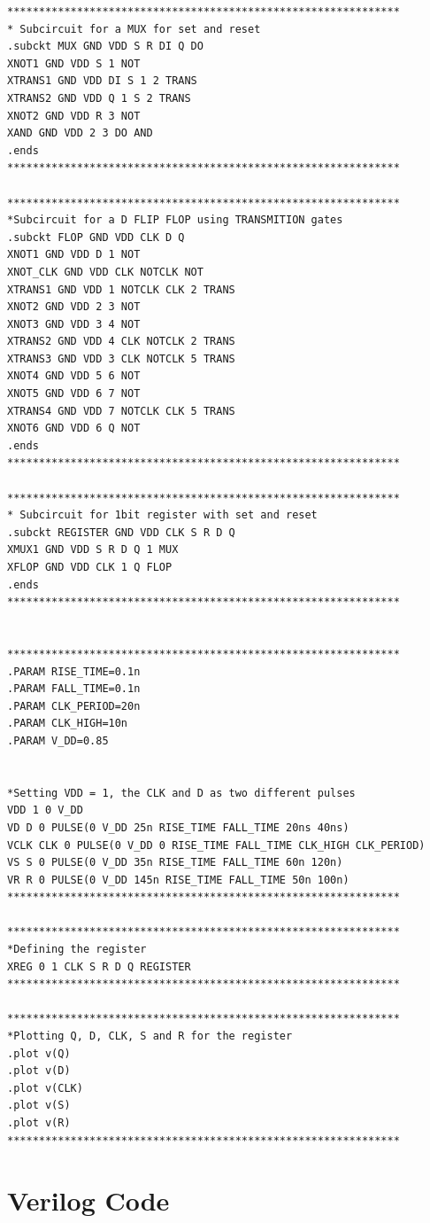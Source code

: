\begin{lstlisting}[style=aimspiceStyle, caption=1-bit register in AIMSPICE, label=testcode]
**************************************************************
* Subcircuit for a MUX for set and reset
.subckt MUX GND VDD S R DI Q DO
XNOT1 GND VDD S 1 NOT
XTRANS1 GND VDD DI S 1 2 TRANS
XTRANS2 GND VDD Q 1 S 2 TRANS
XNOT2 GND VDD R 3 NOT
XAND GND VDD 2 3 DO AND
.ends 
**************************************************************

**************************************************************
*Subcircuit for a D FLIP FLOP using TRANSMITION gates 
.subckt FLOP GND VDD CLK D Q 
XNOT1 GND VDD D 1 NOT
XNOT_CLK GND VDD CLK NOTCLK NOT
XTRANS1 GND VDD 1 NOTCLK CLK 2 TRANS
XNOT2 GND VDD 2 3 NOT
XNOT3 GND VDD 3 4 NOT 
XTRANS2 GND VDD 4 CLK NOTCLK 2 TRANS
XTRANS3 GND VDD 3 CLK NOTCLK 5 TRANS
XNOT4 GND VDD 5 6 NOT
XNOT5 GND VDD 6 7 NOT
XTRANS4 GND VDD 7 NOTCLK CLK 5 TRANS
XNOT6 GND VDD 6 Q NOT
.ends
**************************************************************

**************************************************************
* Subcircuit for 1bit register with set and reset
.subckt REGISTER GND VDD CLK S R D Q 
XMUX1 GND VDD S R D Q 1 MUX
XFLOP GND VDD CLK 1 Q FLOP
.ends
**************************************************************


**************************************************************
.PARAM RISE_TIME=0.1n 
.PARAM FALL_TIME=0.1n 
.PARAM CLK_PERIOD=20n 
.PARAM CLK_HIGH=10n 
.PARAM V_DD=0.85


*Setting VDD = 1, the CLK and D as two different pulses
VDD 1 0 V_DD
VD D 0 PULSE(0 V_DD 25n RISE_TIME FALL_TIME 20ns 40ns)
VCLK CLK 0 PULSE(0 V_DD 0 RISE_TIME FALL_TIME CLK_HIGH CLK_PERIOD)
VS S 0 PULSE(0 V_DD 35n RISE_TIME FALL_TIME 60n 120n)
VR R 0 PULSE(0 V_DD 145n RISE_TIME FALL_TIME 50n 100n)
**************************************************************

**************************************************************
*Defining the register
XREG 0 1 CLK S R D Q REGISTER
**************************************************************

**************************************************************
*Plotting Q, D, CLK, S and R for the register
.plot v(Q)
.plot v(D)
.plot v(CLK)
.plot v(S) 
.plot v(R)
**************************************************************

\end{lstlisting}


\section{Verilog Code}
\label{appendix:Verilog-code}

